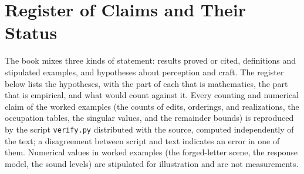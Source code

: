 \chapter{Register of Claims and Their Status}
\label{app:register}

The book mixes three kinds of statement: results proved or cited, definitions and stipulated examples, and hypotheses about perception and craft. The register below lists the hypotheses, with the part of each that is mathematics, the part that is empirical, and what would count against it. Every counting and numerical claim of the worked examples (the counts of edits, orderings, and realizations, the occupation tables, the singular values, and the remainder bounds) is reproduced by the script \texttt{verify.py} distributed with the source, computed independently of the text; a disagreement between script and text indicates an error in one of them. Numerical values in worked examples (the forged-letter scene, the response model, the sound levels) are stipulated for illustration and are not measurements.

